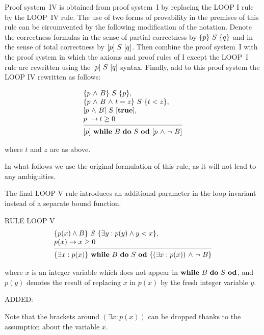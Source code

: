 \documentclass[runningheads]{llncs}       %
\begin{document}
Proof system~IV is obtained from proof system~I by replacing the LOOP
I rule by the LOOP~IV rule. The use of two forms of provability in the
premises of this rule can be circumvented by the following
modification of the notation.  Denote the correctness
formulas in the sense of partial correctness by $\mbox{$\{{p}\}\ {S}\ \{{q}\}$}$ and in
the sense of total correctness by $[{p}]\ {S}\ [{q}]$. Then combine the
proof system~I with the proof system in which the axioms and proof
rules of I except the LOOP~I rule are rewritten using the
$[{p}]\ {S}\ [{q}]$ syntax. Finally, add to this proof system the LOOP IV
rewritten as follows:
\III

\[
 \begin{array}{l}
  \HT{p \A B}{S}{p},                      \\
  \HT{p \A B \A t=z}{S}{t<z},             \\
  \HTT{p \A B}{S}{\mathbf{true}},         \\
  p\ \ra t \geq 0                         \\
  [-\medskipamount]
  \hrulefill                              \\
  \HTT{p}{\WDD{B}{S}}{p \A \neg\ B}
 \end{array}
\]

\NI
where $t$ and $z$ are as above.
\III

In what follows we use the original formulation of this rule, 
as it will not lead to any ambiguities.


The final LOOP V rule introduces an additional parameter
in the loop invariant instead of a separate bound function.

\III

\NI
RULE LOOP V
\[
 \begin{array}{l}
 \HT{p(x)\wedge B}{S}{\exists y: p(y)\wedge y< x},          \\
  p(x)\rightarrow x\geq 0                          \\
  [-\medskipamount]
  \hrulefill                                \\
  \HT{\exists x:p(x)}{\WDD{B}{S}}{(\exists x:p(x)) \A \neg\ B}
 \end{array}
\]

\NI
where $x$ is an integer variable which  does not appear
in $\mbox{$\mbox{{\bf while}\ } {B}\ \mbox{{\bf do}\ } {S}\ \mbox{{\bf od}}$}$, and $p(y)$ denotes the result of replacing
$x$ in $p(x)$ by the fresh integer variable $y$.

ADDED:

Note that the brackets around $(\exists x:p(x))$ can be dropped thanks to the assumption about the variable $x$.
\end{document}
